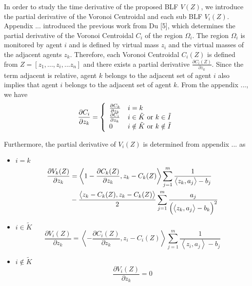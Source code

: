 \documentclass[journal]{IEEEtran}
\newcommand{\threepartdef}[6]
{
	\left\{
	\begin{array}{ll}
		#1 & #2 \\
		#3 & #4 \\
		#5 & #6 
	\end{array}
	\right.
}
\begin{document}
\noindent In order to study the time derivative of the proposed BLF $V(Z)$, we introduce the partial derivative of the Voronoi Centroidal and each sub BLF $V_i(Z)$. Appendix ... introduced the previous work from Du [5], which determines the partial derivative of the Voronoi Centroidal $C_i$ of the region $\Omega_i$. The region $\Omega_i$ is monitored by agent $i$ and is defined by virtual mass $z_i$ and the virtual masses of the adjacent agents $z_k$. Therefore, each Voronoi Centroidal $C_i(Z)$ is defined from $Z = [z_1, ..., z_i, ... z_n]$ and there exists a partial derivative $\frac{\partial C_i(Z)}{\partial z_k} $. Since the term adjacent is relative, agent $k$ belongs to the adjacent set of agent $i$ also implies that agent $i$ belongs to the adjacent set of agent $k$. 
\noindent From the appendix ..., we have
\begin{equation} \notag
\begin{split}
\frac{\partial C_i}{\partial z_k} = \threepartdef	{\frac{\partial C_k}{\partial z_k}}			{i = k}
{\frac{\partial C_i}{\partial z_k}}			{i \in \tilde{K} \text{ or } k \in \tilde{I}}
{0}											{i \notin \tilde{K} \text{ or } k \notin \tilde{I}} 												
\end{split}
\end{equation}

\noindent Furthermore, the partial derivative of $V_i(Z)$ is determined from appendix ... as
\begin{itemize} [leftmargin=*]
	\item $ i = k $
	\begin{equation} \notag
	\begin{split}
	\frac{\partial V_k(Z)}{\partial z_k} & = \left<1 -\frac{\partial C_k(Z)}{\partial z_k}, z_k - C_k(Z)\right>     \sum^{m}_{j=1} \frac{1}{\left<z_k, a_j \right> - b_j} \\
	& - \frac{\left< z_k - C_k(Z), z_k - C_k(Z)\right>}{2} 					\sum^{m}_{j=1} \frac{a_j}{\left (\left<z_k, a_j \right> - b_k \right )^2} 
	\end{split}
	\end{equation}
	
	\item $ i \in \tilde{K} $
	\[\frac{\partial V_i(Z)}{\partial z_k} = \left<- \frac{\partial C_i(Z)}{\partial z_k}, z_i - C_i(Z)\right>     \sum^{m}_{j=1} \frac{1}{\left<z_i, a_j \right> - b_j}\]
	
	\item $ i \notin \tilde{K} $
	\[\frac{\partial V_i(Z)}{\partial z_k} = 0 \]
\end{itemize}
\end{document}
